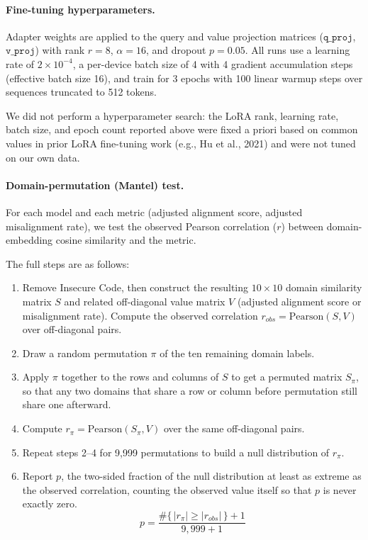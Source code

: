 \documentclass{article}
\begin{document}
\paragraph{Fine-tuning hyperparameters.} Adapter weights are applied to the query and value projection matrices ($\texttt{q\_proj}$, $\texttt{v\_proj}$) with rank $r=8$, $\alpha=16$, and dropout $p=0.05$. All runs use a learning rate of $2 \times 10^{-4}$, a per-device batch size of 4 with 4 gradient accumulation steps (effective batch size 16), and train for 3 epochs with 100 linear warmup steps over sequences truncated to 512 tokens.

We did not perform a hyperparameter search: the LoRA rank, learning rate, batch size, and epoch count reported above were fixed a priori based on common values in prior LoRA fine-tuning work (e.g., Hu et al., 2021) and were not tuned on our own data.

\paragraph{Domain-permutation (Mantel) test.} For each model and each metric (adjusted alignment score, adjusted misalignment rate), we test the observed Pearson correlation ($r$) between domain-embedding cosine similarity and the metric.


The full steps are as follows:
\begin{enumerate}
    \item Remove Insecure Code, then construct the resulting $10 \times 10$ domain similarity matrix $S$ and related off-diagonal value matrix $V$ (adjusted alignment score or misalignment rate). Compute the observed correlation $r_{obs} = \text{Pearson}(S, V)$ over off-diagonal pairs.
    \item Draw a random permutation $\pi$ of the ten remaining domain labels.
    \item Apply $\pi$ together to the rows and columns of $S$ to get a permuted matrix $S_\pi$, so that any two domains that share a row or column before permutation still share one afterward.
    \item Compute $r_\pi = \text{Pearson}(S_\pi, V)$ over the same off-diagonal pairs.
    \item Repeat steps 2--4 for 9,999 permutations to build a null distribution of $r_\pi$.
    \item Report $p$, the two-sided fraction of the null distribution at least as extreme as the observed correlation, counting the observed value itself so that $p$ is never exactly zero.
    \[
    p = \frac{\#\{\, |r_\pi| \geq |r_{obs}| \,\} + 1}{9{,}999 + 1}
    \]
\end{enumerate}
\end{document}
